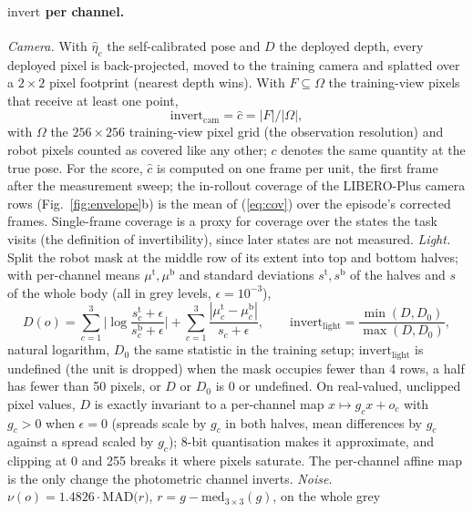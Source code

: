 \documentclass{article}
\newcommand{\invert}{\mathrm{invert}}
\begin{document}
\paragraph{$\invert$ per channel.}
\emph{Camera.} With $\hat\eta_c$ the self-calibrated pose and $D$ the deployed depth, every deployed pixel is
back-projected, moved to the training camera and splatted over a $2\times2$ pixel footprint (nearest depth wins). With $F \subseteq
\Omega$ the training-view pixels that receive at least one point,
\begin{equation}
\invert_{\mathrm{cam}} = \hat c = |F| / |\Omega| ,
\label{eq:cov}
\end{equation}
with $\Omega$ the $256\times256$ training-view pixel grid (the observation resolution) and robot pixels counted as
covered like any other; $c$ denotes the same quantity at the true pose. For the score, $\hat c$ is computed on one
frame per unit, the first frame after the measurement sweep; the in-rollout coverage of the LIBERO-Plus camera rows
(Fig.~\ref{fig:envelope}b) is the mean of (\ref{eq:cov}) over the episode's corrected frames. Single-frame coverage is a
proxy for coverage over the states the task visits (the definition of invertibility), since later states are not
measured.
\emph{Light.} Split the robot mask at the middle row of its extent into top and bottom halves; with per-channel means
$\mu^{\mathrm t}, \mu^{\mathrm b}$ and standard deviations $s^{\mathrm t}, s^{\mathrm b}$ of the halves and $s$ of the
whole body (all in grey levels, $\epsilon = 10^{-3}$),
\begin{equation}
D(o) = \sum_{c=1}^{3} \Big| \log \frac{s^{\mathrm t}_c + \epsilon}{s^{\mathrm b}_c + \epsilon} \Big|
+ \sum_{c=1}^{3} \frac{|\mu^{\mathrm t}_c - \mu^{\mathrm b}_c|}{s_c + \epsilon},
\qquad
\invert_{\mathrm{light}} = \frac{\min(D, D_0)}{\max(D, D_0)},
\end{equation}
natural logarithm, $D_0$ the same statistic in the training setup; $\invert_{\mathrm{light}}$ is undefined (the unit
is dropped) when the mask occupies fewer than 4 rows, a half has fewer than 50 pixels, or $D$ or $D_0$ is 0 or
undefined. On
real-valued, unclipped pixel values, $D$ is exactly invariant to a per-channel map $x \mapsto g_c x + o_c$ with
$g_c > 0$ when $\epsilon = 0$ (spreads scale by $g_c$ in both halves, mean differences by $g_c$ against a spread scaled
by $g_c$); 8-bit quantisation makes it approximate, and clipping at 0 and 255 breaks it where pixels saturate. The
per-channel affine map is the only change the photometric channel inverts.
\emph{Noise.} $\nu(o) = 1.4826 \cdot \mathrm{MAD}\big(r\big)$, $r = g - \mathrm{med}_{3\times3}(g)$, on the whole grey
\end{document}
